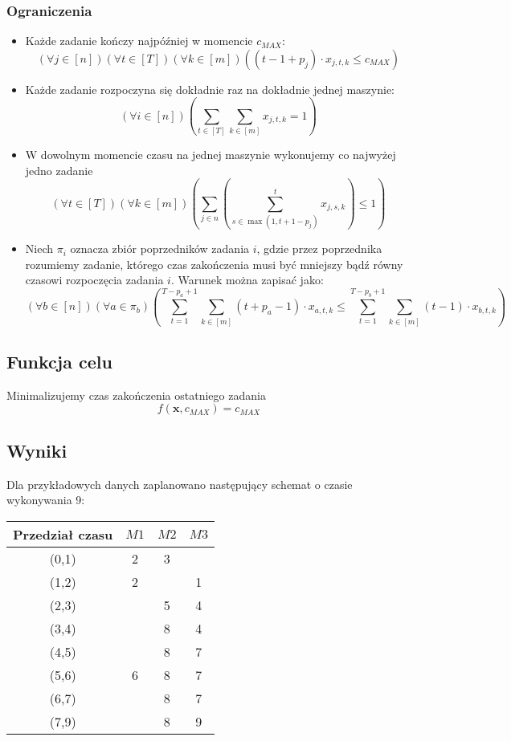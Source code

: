 \documentclass{article}
\def\x{\textbf{x}}
\begin{document}
\subsubsection{Ograniczenia}
\begin{itemize}
\item Każde zadanie kończy najpóźniej w momencie $c_{MAX}$:
$$(\forall j \in [n])(\forall t \in [T])(\forall k \in [m])\left((t-1+p_j)\cdot x_{j,t,k} \leq c_{MAX }\right)$$
\item Każde zadanie rozpoczyna się dokładnie raz na dokładnie jednej maszynie:
$$(\forall i \in [n])\left(\sum_{t\in [T]}\sum_{k\in[m]}x_{j,t,k}=1\right)$$
\item W dowolnym momencie czasu na jednej maszynie wykonujemy co najwyżej jedno zadanie
$$(\forall t \in [T])(\forall k\in[m])\left(\sum_{j\in n} \left(\sum_{s\in \max(1, t+1-p_j)}^t x_{j,s,k} \right) \leq 1\right)$$
\item Niech $\pi_i$ oznacza zbiór poprzedników zadania $i$, gdzie przez poprzednika rozumiemy zadanie, którego czas zakończenia musi być mniejszy bądź równy czasowi rozpoczęcia zadania $i$. Warunek można zapisać jako:
$$(\forall b \in [n])(\forall a \in \pi_b)\left( \sum_{t=1}^{T-p_a+1}\sum_{k\in[m]} (t+p_a-1) \cdot x_{a,t,k}  \leq \sum_{t=1}^{T-p_b+1}\sum_{k\in[m]} (t-1) \cdot x_{b,t,k}  \right)$$
\end{itemize}

\subsection{Funkcja celu}
Minimalizujemy czas zakończenia ostatniego zadania
$$f(\x,c_{MAX})=c_{MAX}$$
 
\subsection{Wyniki}
Dla przykładowych danych zaplanowano następujący schemat o czasie wykonywania 9:
\begin{center}
\begin{tabular}{|c|c|c|c|}
\hline
\textbf{Przedział czasu} & \textbf{$M1$} & \textbf{$M2$} & \textbf{$M3$}\\
\hline
(0,1) & 2 & 3 &  \\
\hline
(1,2) & 2 & & 1 \\
\hline
(2,3) &  & 5 & 4 \\
\hline
(3,4) &  & 8 & 4 \\
\hline
(4,5) &  & 8 & 7 \\
\hline
(5,6) & 6 & 8 & 7 \\
\hline
(6,7) &  & 8 & 7 \\
\hline
(7,9) &  & 8 & 9 \\
\hline

\end{tabular}
\end{center}
\end{document}
